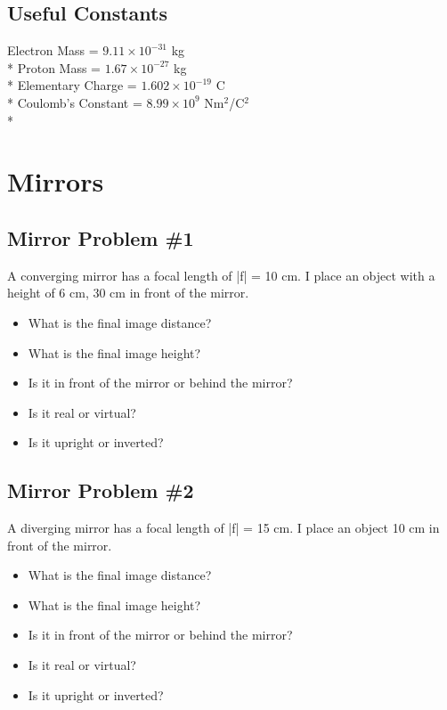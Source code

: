 \documentclass[11pt]{article}
\begin{document}
\maketitle
\tableofcontents
\hspace{30mm}

\subsection*{Useful Constants}
Electron Mass = $9.11 \times 10^{-31}$ kg \\*
Proton Mass = $1.67 \times 10^{-27}$ kg \\*
Elementary Charge = $1.602 \times 10^{-19}$ C \\*
Coulomb's Constant = $8.99 \times 10^9$ Nm$^2$/C$^2$ \\*


\pagebreak
\section{Mirrors}

\subsection{Mirror Problem \#1}
A converging mirror has a focal length of |f| = 10 cm.  I place an object with a height of 6 cm, 30 cm in front of the mirror.  

\begin{itemize}
\item What is the final image distance?
\item What is the final image height?
\item Is it in front of the mirror or behind the mirror?  
\item Is it real or virtual?
\item Is it upright or inverted?
\end{itemize}

\subsection{Mirror Problem \#2}
A diverging mirror has a focal length of |f| = 15 cm.  I place an object 10 cm in front of the mirror.  

\begin{itemize}
\item What is the final image distance?
\item What is the final image height?
\item Is it in front of the mirror or behind the mirror?  
\item Is it real or virtual?
\item Is it upright or inverted?
\end{itemize}
\end{document}
